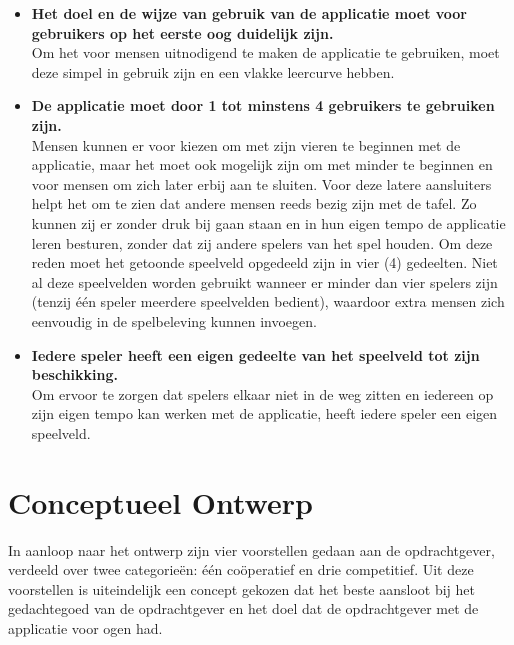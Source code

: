 \documentclass{acm}
\begin{document}
\begin{itemize}
	\item \textbf{Het doel en de wijze van gebruik van de applicatie moet voor gebruikers op het eerste oog duidelijk zijn.} \\ Om het voor mensen uitnodigend te maken de applicatie te gebruiken, moet deze simpel in gebruik zijn en een vlakke leercurve hebben.
	\item \textbf{De applicatie moet door 1 tot minstens 4 gebruikers te gebruiken zijn.} \\ Mensen kunnen er voor kiezen om met zijn vieren te beginnen met de applicatie, maar het moet ook mogelijk zijn om met minder te beginnen en voor mensen om zich later erbij aan te sluiten. Voor deze latere aansluiters helpt het om te zien dat andere mensen reeds bezig zijn met de tafel. Zo kunnen zij er zonder druk bij gaan staan en in hun eigen tempo de applicatie leren besturen, zonder dat zij andere spelers van het spel houden. Om deze reden moet het getoonde speelveld opgedeeld zijn in vier (4) gedeelten. Niet al deze speelvelden worden gebruikt wanneer er minder dan vier spelers zijn (tenzij \'e\'en speler meerdere speelvelden bedient), waardoor extra mensen zich eenvoudig in de spelbeleving kunnen invoegen.
	\item \textbf{Iedere speler heeft een eigen gedeelte van het speelveld tot zijn beschikking.} \\ Om ervoor te zorgen dat spelers elkaar niet in de weg zitten en iedereen op zijn eigen tempo kan werken met de applicatie, heeft iedere speler een eigen speelveld.
\end{itemize}

\section{Conceptueel Ontwerp}
\label{sec_concept}
In aanloop naar het ontwerp zijn vier voorstellen gedaan aan de opdrachtgever, verdeeld over twee categorie\"en: \'e\'en co\"operatief en drie competitief. Uit deze voorstellen is uiteindelijk een concept gekozen dat het beste aansloot bij het gedachtegoed van de opdrachtgever en het doel dat de opdrachtgever met de applicatie voor ogen had.
\end{document}
